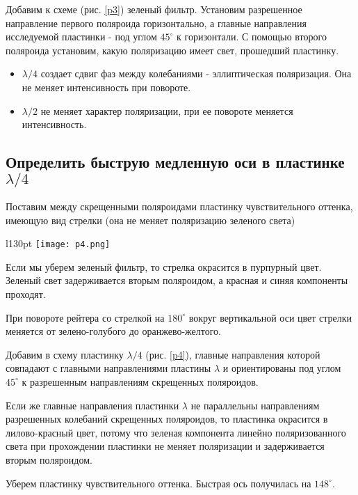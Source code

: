 \documentclass[12pt,a4paper]{article}
\begin{document}
Добавим к схеме (рис. \ref{p3}) зеленый фильтр. Установим разрешенное направление первого поляроида горизонтально, а главные направления исследуемой пластинки - под углом $45^\circ$ к горизонтали. С помощью второго поляроида установим, какую поляризацию имеет свет, прошедший пластинку. 

\begin{itemize}
\item
$\lambda/4$ создает сдвиг фаз между колебаниями - эллиптическая поляризация. Она не меняет интенсивность при повороте.

\item
$\lambda/2$ не меняет характер поляризации, при ее повороте меняется интенсивность. 
\end{itemize}

\subsection{Определить быструю  медленную оси в пластинке $\lambda/4$}

Поставим между скрещенными поляроидами пластинку чувствительного оттенка, имеющую вид стрелки (она не меняет поляризацию зеленого света)

\begin{wrapfigure}[11]{l}{130pt}
\texttt{[image: p4.png]}
\caption{Определение направлений большей и меньшей скорости}
\label{p4}
\end{wrapfigure}

Если мы уберем зеленый фильтр, то стрелка окрасится в пурпурный цвет. Зеленый свет задерживается вторым поляроидом, а красная и синяя компоненты проходят. 

При повороте рейтера со стрелкой на $180^\circ$ вокруг вертикальной оси цвет стрелки меняется от зелено-голубого до оранжево-желтого. 

Добавим в схему пластинку  $\lambda/4$ (рис. \ref{p4}), главные направления которой совпадают с главными направлениями пластины $\lambda$ и ориентированы под углом $45^\circ$ к разрешенным направлениям скрещенных поляроидов. 


Если же главные направления пластинки $\lambda$ не параллельны направлениям разрешенных колебаний скрещенных поляроидов, то пластинка окрасится в лилово-красный цвет, потому что зеленая компонента линейно поляризованного света при прохождении пластинки не меняет поляризации и задерживается вторым поляроидом. 

Уберем пластинку чувствительного оттенка. Быстрая ось получилась на $148^\circ$.
\end{document}
